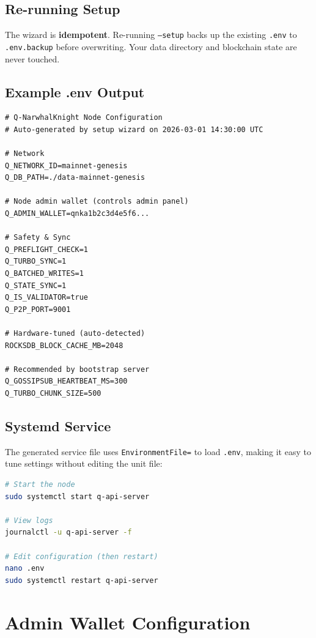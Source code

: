 \documentclass[11pt,a4paper]{article}
\begin{document}
\subsection{Re-running Setup}

The wizard is \textbf{idempotent}. Re-running \texttt{--setup} backs up
the existing \texttt{.env} to \texttt{.env.backup} before overwriting.
Your data directory and blockchain state are never touched.

\subsection{Example .env Output}

\begin{lstlisting}[title={Auto-generated .env}]
# Q-NarwhalKnight Node Configuration
# Auto-generated by setup wizard on 2026-03-01 14:30:00 UTC

# Network
Q_NETWORK_ID=mainnet-genesis
Q_DB_PATH=./data-mainnet-genesis

# Node admin wallet (controls admin panel)
Q_ADMIN_WALLET=qnka1b2c3d4e5f6...

# Safety & Sync
Q_PREFLIGHT_CHECK=1
Q_TURBO_SYNC=1
Q_BATCHED_WRITES=1
Q_STATE_SYNC=1
Q_IS_VALIDATOR=true
Q_P2P_PORT=9001

# Hardware-tuned (auto-detected)
ROCKSDB_BLOCK_CACHE_MB=2048

# Recommended by bootstrap server
Q_GOSSIPSUB_HEARTBEAT_MS=300
Q_TURBO_CHUNK_SIZE=500
\end{lstlisting}

\subsection{Systemd Service}

The generated service file uses \texttt{EnvironmentFile=} to load \texttt{.env},
making it easy to tune settings without editing the unit file:

\begin{lstlisting}[language=bash,title={Managing the service}]
# Start the node
sudo systemctl start q-api-server

# View logs
journalctl -u q-api-server -f

# Edit configuration (then restart)
nano .env
sudo systemctl restart q-api-server
\end{lstlisting}

\section{Admin Wallet Configuration}
\end{document}
